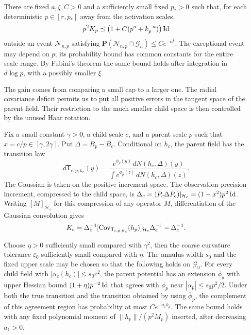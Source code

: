 \begin{proposition}\label{prop:variance-curvature}
There are fixed $a,\xi,C>0$ and a sufficiently small fixed $p_*>0$ such
that, for each deterministic $p\in[r,p_*]$ away from the activation
scales,
\begin{equation}\label{eq:source-17}
 p^2K_p\preceq\bigl(1+C(p^a+k_p^{-a})\bigr)\operatorname{Id}
\end{equation}
outside an event $\mathcal N_{n,p}$ satisfying
$\mathbf P(\mathcal N_{n,p}\cap\mathcal G_n)\le Ce^{-n^\xi}$.
The exceptional event may depend on $p$; its probability bound has common
constants for the entire scale range. By Fubini's theorem the same bound
holds after integration in $d\log p$, with a possibly smaller $\xi$.
\end{proposition}

The gain comes from comparing a small cap to a larger one. The radial
covariance deficit permits us to put all positive errors in the tangent
space of the parent field. Their restriction to the much smaller child
space is then controlled by the unused Haar rotation.

Fix a small constant $\gamma>0$, a child scale $c$, and a parent scale $p$
such that $x=c/p\in[\gamma,2\gamma]$. Put $\Delta=B_p-B_c$.
Conditional on $h_c$, the parent field has the transition law
\[
 d\mathsf T_{c,p,h_c}(y)
 =\frac{e^{\phi_p(y)}\,dN(h_c,\Delta)(y)}
        {\int e^{\phi_p(z)}\,dN(h_c,\Delta)(z)}.
\]
The Gaussian is taken on the positive-increment space. The observation
precision increment, compressed to the child space, is
$\Delta_c=(P_c\Delta P_c)|_{\mathcal H_c}=(1-x^2)p^2\operatorname{Id}$.
Writing $[M]_{\mathcal H_c}$ for this compression of any operator $M$,
differentiation of the Gaussian convolution gives
\begin{equation}\label{eq:source-18}
 K_c=\Delta_c^{-1}
       [\operatorname{Cov}_{\mathsf T_{c,p,h_c}}(h_p)]_{\mathcal H_c}\Delta_c^{-1}
        -\Delta_c^{-1}.
\end{equation}

\begin{lemma}\label{lem:variance-extension}
Choose $\eta>0$ sufficiently small compared with $\gamma^2$, then the
coarse curvature tolerance $\varepsilon_0$ sufficiently small compared with
$\eta$. The annulus width $s_0$ and the fixed upper scale may be chosen
so that the following holds on $\mathcal G_n$. For every child field with
$|\alpha_c(h_c)|\le s_0c^2$, the parent potential has an extension
$\overline\phi_p$ with upper Hessian bound $(1+\eta)p^{-2}\operatorname{Id}$ that agrees
with $\phi_p$ near $|\alpha_p|\le s_0p^2/2$. Under both the true transition
and the transition obtained by using $\overline\phi_p$, the complement of
this agreement region has probability at most $Ce^{-a_1k_p}$. The same
bound holds with any fixed polynomial moment of
$\|h_p\|/(p^2M_p)$ inserted, after decreasing $a_1>0$.
\end{lemma}

